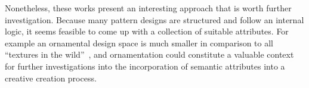 Nonetheless, these works present an interesting approach that is worth further investigation. Because many pattern designs are structured and follow an internal logic, it seems feasible to come up with a collection of suitable attributes. For example an ornamental design space is much smaller in comparison to all ``textures in the wild''~\cite{cimpoi_2014_dtw}, and ornamentation could constitute a valuable context for further investigations into the incorporation of semantic attributes into a creative creation process.


